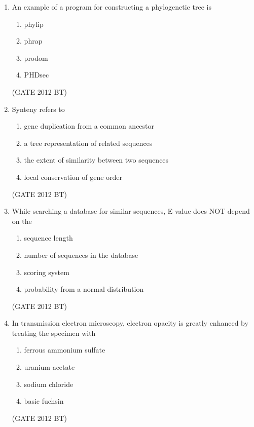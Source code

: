 \documentclass[journal,12pt,onecolumn]{IEEEtran}
\theoremstyle{remark}
\begin{document}
\begin{enumerate}
\item 	An example of a program for constructing a phylogenetic tree is
\begin{multicols}{4}
\begin{enumerate}
\item phylip	
\item  phrap	
\item  prodom	
\item  PHDsec
\end{enumerate}
\end{multicols} \hfill(GATE 2012 BT)

\item 	Synteny refers to
\begin{multicols}{2}
\begin{enumerate}
\item 	gene duplication from a common ancestor
\item 	a tree representation of related sequences
\item 	the extent of similarity between two sequences
\item 	local conservation of gene order
\end{enumerate}
\end{multicols} \hfill(GATE 2012 BT)

\item 	While searching a database for similar sequences, E value does NOT depend on the
\begin{enumerate}
\item 	sequence length	
\item  number of sequences in the database
\item  scoring system
\item  probability from a normal distribution
\end{enumerate} \hfill(GATE 2012 BT)

\item 	In transmission electron microscopy, electron opacity is greatly enhanced by treating the specimen with
\begin{multicols}{2}
\begin{enumerate}
\item	ferrous ammonium sulfate	
\item  uranium acetate
\item  sodium chloride	
\item  basic fuchsin
\end{enumerate}
\end{multicols} \hfill(GATE 2012 BT)


\end{enumerate}
\end{document}
